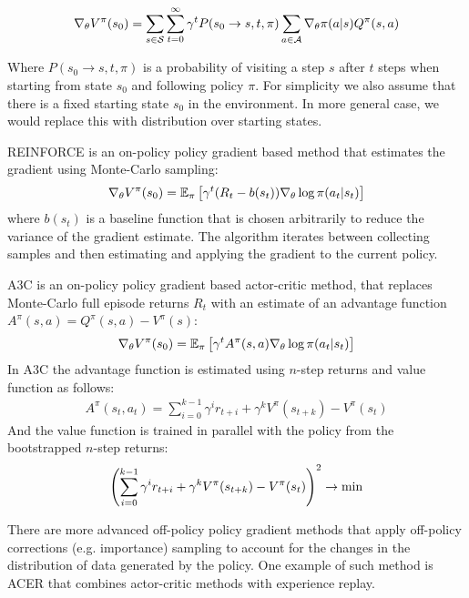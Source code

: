 \begin{align*}
    \nabla_{\theta} V^{\pi}(s_0) = \sum_{s \in \mathcal{S}} \sum_{t = 0}^{\infty} \gamma^t
    P(s_0 \to s, t, \pi) \sum_{a \in \mathcal{A}} \nabla_{\theta} \pi(a|s) Q^{\pi}(s,a)
\end{align*}

Where $P(s_0 \to s, t, \pi)$ is a probability of visiting a step $s$ after $t$ steps when starting
from state $s_0$ and following policy $\pi$. For simplicity we  also assume that there is a fixed
starting state $s_0$ in the environment. In more general case, we would replace this with
distribution over starting states.

REINFORCE is an on-policy policy gradient based method that estimates the gradient using
Monte-Carlo sampling:
\begin{align*}
    \nabla_{\theta} V^{\pi}(s_0) = \mathbb{E}_{\pi} \left[ \gamma^t (R_t - b(s_t)) \nabla_{\theta} \log{\pi(a_t|s_t)} \right]
\end{align*}
where $b(s_t)$ is a baseline function that is chosen arbitrarily to reduce the variance of the gradient
estimate. The algorithm iterates between collecting samples and then estimating and applying the gradient to
the current policy.

A3C\cite{mnih2016asynchronous} is an on-policy policy gradient based actor-critic method, that replaces Monte-Carlo full
episode returns $R_t$ with an estimate of an advantage function $A^{\pi}(s,a) = Q^{\pi}(s,a) -
V^{\pi}(s)$:
\begin{align*}
    \nabla_{\theta} V^{\pi}(s_0) = \mathbb{E}_{\pi} \left[ \gamma^t A^{\pi}(s,a) \nabla_{\theta} \log{\pi(a_t|s_t)} \right]
\end{align*}
In A3C the advantage function is estimated using $n$-step returns and value function as follows:
\begin{align*}
    A^{\pi}(s_t,a_t) = \sum_{i = 0}^{k - 1} \gamma^i r_{t + i} + \gamma^k V^{\pi}(s_{t + k}) -
    V^{\pi}(s_t)
\end{align*}
And the value function is trained in parallel with the policy from the bootstrapped $n$-step returns:
\begin{align*}
    \left( \sum_{i = 0}^{k - 1} \gamma^i r_{t + i} + \gamma^k V^{\pi}(s_{t + k}) - V^{\pi}(s_t) \right)^2 \to \min
\end{align*}

There are more advanced off-policy policy gradient methods that apply off-policy corrections
(e.g. importance) sampling to account for the changes in the distribution of data generated by the
policy. One example of such method is ACER\cite{wang2016sample} that combines actor-critic methods
with experience replay.
